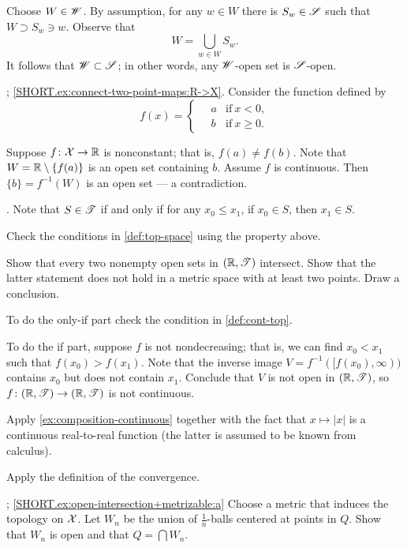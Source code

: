 Choose $W\in \mathscr{W}$.
By assumption, for any $w\in W$ there is $S_w\in \mathscr{S}$ such that $W\supset S_w\ni w$.
Observe that 
\[W=\bigcup_{w\in W}S_w.\]
It follows that $\mathscr{W}\subset \mathscr{S}$;
in other words, any $\mathscr{W}$-open set is $\mathscr{S}$-open.

\parbf{\ref{ex:connect-two-point-maps}}; \ref{SHORT.ex:connect-two-point-maps:R->X}.
Consider the function defined by
\[
f(x)=
\begin{cases}
\quad a &\text{if}\ x< 0,
\\
\quad b &\text{if}\ x\ge 0.
\end{cases}
\]

 Suppose $f\colon\mathcal{X}\to \mathbb{R}$ is nonconstant;
that is, $f(a)\ne f(b)$.
Note that $W=\mathbb{R}\setminus\{f(a)\}$ is an open set containing $b$.
Assume $f$ is continuous.
Then $\{b\}=f^{-1}(W)$ is an open set --- a contradiction.

\parbf{\ref{ex:Rge}}. Note that $S\in \mathscr{T}$ if and only if for any $x_0\le x_1$, if $x_0\in S$, then $x_1\in S$.

Check the conditions in \ref{def:top-space} using the property above.

Show that every two nonempty open sets in $(\mathbb{R},\mathscr{T})$ intersect.
Show that the latter statement does not hold in a metric space with at least two points.
Draw a conclusion.

To do the only-if part check the condition in \ref{def:cont-top}.

To do the if part, suppose $f$ is not nondecreasing;
that is, we can find $x_0<x_1$ such that $f(x_0)>f(x_1)$.
Note that the inverse image $V=f^{-1}([f(x_0),\infty))$ contains $x_0$ but does not contain $x_1$.
Conclude that $V$ is not open in $(\mathbb{R},\mathscr{T})$, so $f\colon(\mathbb{R},\mathscr{T})\to(\mathbb{R},\mathscr{T})$ is not continuous.

Apply \ref{ex:composition-continuous} together with the fact that $x\mapsto |x|$ is a continuous real-to-real function (the latter is assumed to be known from calculus).

Apply the definition of the convergence.

\parbf{\ref{ex:open-intersection+metrizable}}; \ref{SHORT.ex:open-intersection+metrizable:a}
Choose a metric that induces the topology on $\mathcal{X}$.
Let $W_n$ be the union of $\tfrac1n$-balls centered at points in $Q$.
Show that $W_n$ is open and that $Q=\bigcap W_n$.

